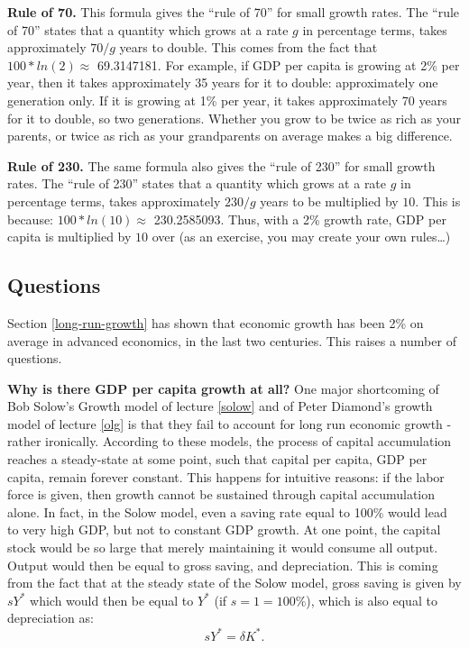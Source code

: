 \documentclass[]{book}
\theoremstyle{definition}
\theoremstyle{definition}
\theoremstyle{definition}
\theoremstyle{remark}
\begin{document}
\textbf{Rule of 70.} This formula gives the ``rule of 70'' for small
growth rates. The ``rule of 70'' states that a quantity which grows at a
rate \(g\) in percentage terms, takes approximately \(70/g\) years to
double. This comes from the fact that \(100*ln(2) \approx\) 69.3147181.
For example, if GDP per capita is growing at 2\% per year, then it takes
approximately 35 years for it to double: approximately one generation
only. If it is growing at 1\% per year, it takes approximately 70 years
for it to double, so two generations. Whether you grow to be twice as
rich as your parents, or twice as rich as your grandparents on average
makes a big difference.

\textbf{Rule of 230.} The same formula also gives the ``rule of 230''
for small growth rates. The ``rule of 230'' states that a quantity which
grows at a rate \(g\) in percentage terms, takes approximately \(230/g\)
years to be multiplied by \(10\). This is because:
\(100*ln(10) \approx\) 230.2585093. Thus, with a 2\% growth rate, GDP
per capita is multiplied by \(10\) over (as an exercise, you may create
your own rules\ldots{})

\subsection{Questions}\label{questions}

Section \ref{long-run-growth} has shown that economic growth has been
2\% on average in advanced economics, in the last two centuries. This
raises a number of questions.

\textbf{Why is there GDP per capita growth at all?} One major
shortcoming of Bob Solow's Growth model of lecture \ref{solow} and of
Peter Diamond's growth model of lecture \ref{olg} is that they fail to
account for long run economic growth - rather ironically. According to
these models, the process of capital accumulation reaches a steady-state
at some point, such that capital per capita, GDP per capita, remain
forever constant. This happens for intuitive reasons: if the labor force
is given, then growth cannot be sustained through capital accumulation
alone. In fact, in the Solow model, even a saving rate equal to 100\%
would lead to very high GDP, but not to constant GDP growth. At one
point, the capital stock would be so large that merely maintaining it
would consume all output. Output would then be equal to gross saving,
and depreciation. This is coming from the fact that at the steady state
of the Solow model, gross saving is given by \(s Y^{*}\) which would
then be equal to \(Y^{*}\) (if \(s=1=100\%\)), which is also equal to
depreciation as: \[s Y^{*}=\delta K^{*}.\]
\end{document}
